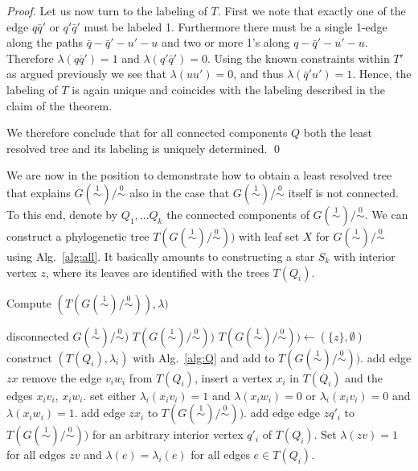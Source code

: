 \documentclass[smallextended]{svjour3}
\newcommand{\rev}[1]{\begingroup\color{blue}#1\endgroup}
\newcommand{\Ro}{\mathrel{\overset{0}{\sim}}}
\newcommand{\Rl}{\mathrel{\overset{1}{\sim}}}
\begin{document}
{\begin{proof}
  Let us now turn to the labeling of $T$. First we note that exactly one of
  the edge $q\bar q'$ or $q'\bar q'$ must be labeled 1. Furthermore there
  must be a single 1-edge along the paths $\bar q-\bar q'-u' -u$ and two or
  more 1's along $q-\bar q'-u' -u$. Therefore $\lambda(q\bar q')=1$ and
  $\lambda(q'\bar q')=0$. Using the known constraints within $T'$ as argued
  previously we see that $\lambda(uu')=0$, and thus $\lambda(\bar
  q'u')=1$. Hence, the labeling of $T$ is again unique and coincides with
  the labeling described in the claim of the theorem.  

  We therefore conclude that for all connected components $Q$ both the
  least resolved tree and its labeling is uniquely determined.  \qed
\end{proof}
}

We are now in the position to demonstrate how to obtain a least resolved
tree that explains $G(\Rl)/\Ro$ also in the case that $G(\Rl)/\Ro$ itself
is not connected. To this end, denote by $Q_1,\dots Q_k$ the connected
components of $G(\Rl)/\Ro$. We can construct a \rev{phylogenetic tree
  $T(G(\Rl)/\Ro))$ with leaf set $X$} for $G(\Rl)/\Ro$ using Alg.\
\ref{alg:all}. It basically amounts to constructing a star $S_k$ with
interior vertex $z$, where its leaves are identified with the trees
$T(Q_i)$.

\begin{algorithm}
\caption{Compute $(T(G(\Rl)/\Ro)), \lambda)$}
\label{alg:all}
\begin{algorithmic}[1]
  \REQUIRE disconnected $G(\Rl)/\Ro)$
  \ENSURE $T(G(\Rl)/\Ro))$	
  \STATE $T(G(\Rl)/\Ro)) \gets (\{z\},\emptyset)$
     \STATE	construct $(T(Q_i), \lambda_i)$ with Alg.\ \ref{alg:Q}
		and add to $T(G(\Rl)/\Ro))$.
	\STATE add edge $zx$
        \STATE remove the edge
                $v_iw_i$ from $T(Q_i)$, insert a vertex $x_i$ in $T(Q_i)$
                and the edges $x_iv_i$, $x_iw_i$. 
        \STATE  set either $\lambda_{i}(x_iv_i)=1$ and $\lambda(x_iw_i)=0$
		or $\lambda_{i}(x_iv_i)=0$ and $\lambda(x_iw_i)=1$. 
                \label{step:edge}
	\STATE  add edge $zx_i$ to $T(G(\Rl)/\Ro))$.
     \ELSE \STATE \label{item:z}  	
                add edge edge $zq'_i$ to  $T(G(\Rl)/\Ro))$
		for an arbitrary interior vertex $q'_i$ of $T(Q_i)$. 
     \ENDIF		 
   \ENDFOR
   \STATE       Set $\lambda(zv)=1$ for all edges $zv$ and 
		$\lambda(e)=\lambda_i(e)$ for all edges $e\in T(Q_i)$.	
\end{algorithmic}
\end{algorithm}
\end{document}
